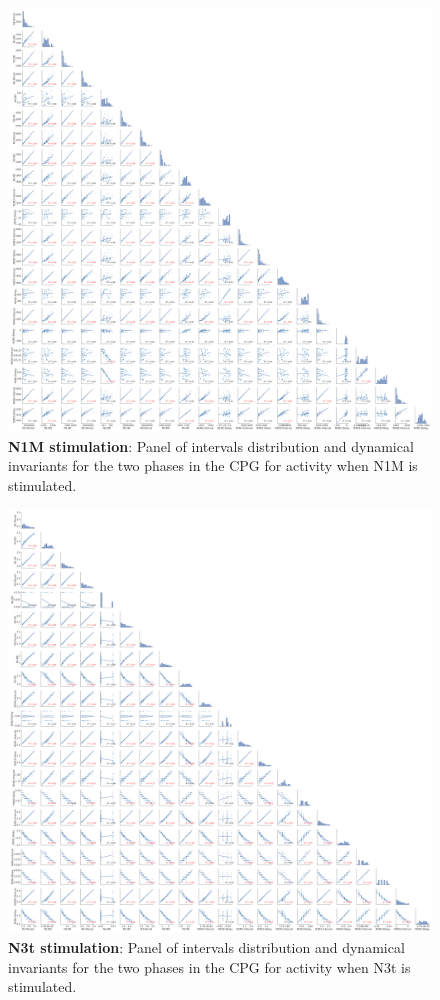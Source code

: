 \begin{figure}[htbp]
	\centering
	\includegraphics[width=\textwidth]{./invariants/data/MODEL/n1m_driven/images/3phases/_output_pairplot.png}
	\caption{\textbf{N1M stimulation}: Panel of intervals distribution and dynamical invariants for the two phases in the CPG for activity when N1M is stimulated.}
	\label{fig:model n1m stimulation pairplot}
\end{figure}
 

\begin{figure}[htbp]
	\centering
	\includegraphics[width=\textwidth]{./invariants/data/MODEL/n3t_driven/images/3phases/_output_pairplot.png}
	\caption{\textbf{N3t stimulation}: Panel of intervals distribution and dynamical invariants for the two phases in the CPG for activity when N3t is stimulated.}
	\label{fig:model n3t stimulation pairplot}
\end{figure}


